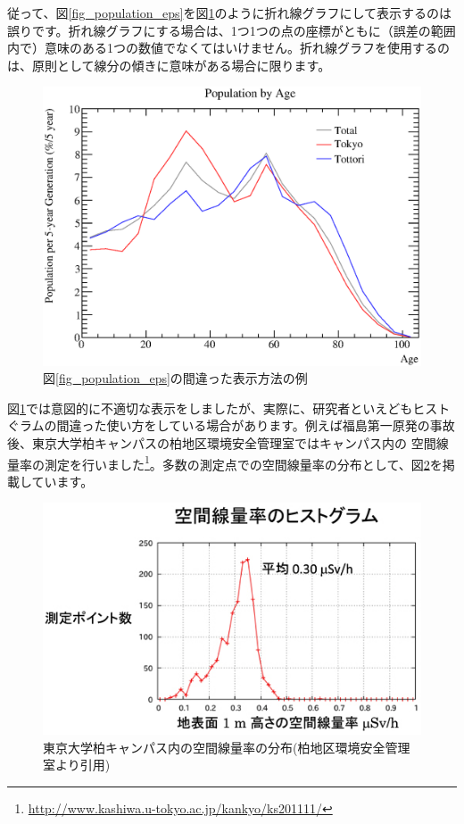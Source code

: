 従って、図\ref{fig_population_eps}を図\ref{fig_population2_eps}のように折れ線グラフにして表示するのは誤りです。折れ線グラフにする場合は、1つ1つの点の座標がともに（誤差の範囲内で）意味のある1つの数値でなくてはいけません。折れ線グラフを使用するのは、原則として線分の傾きに意味がある場合に限ります。

\begin{figure}
  \centering
  \includegraphics[width=12cm,clip]{fig/population2.eps}
  \caption{図\ref{fig_population_eps}の間違った表示方法の例}
  \label{fig_population2_eps}
\end{figure}

図\ref{fig_population2_eps}では意図的に不適切な表示をしましたが、実際に、研究者といえどもヒストぐラムの間違った使い方をしている場合があります。例えば福島第一原発の事故後、東京大学柏キャンパスの柏地区環境安全管理室ではキャンパス内の 空間線量率の測定を行いました\footnote{\url{http://www.kashiwa.u-tokyo.ac.jp/kankyo/ks201111/}}。多数の測定点での空間線量率の分布として、図\ref{fig_Kashiwa_png}を掲載しています。

\begin{figure}
  \centering
  \includegraphics[scale=0.8,bb= 0 0 485 297]{fig/Kashiwa.png}
  \caption{東京大学柏キャンパス内の空間線量率の分布(柏地区環境安全管理室より引用)}
  \label{fig_Kashiwa_png}
\end{figure}

